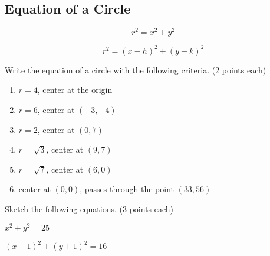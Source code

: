 \documentclass[12pt]{article}
\begin{document}
\pagebreak

\subsection*{Equation of a Circle}

$$r^2=x^2+y^2$$

$$r^2=(x-h)^2+(y-k)^2$$

Write the equation of a circle with the following criteria. (2 points each)\\

\begin{enumerate}[resume]

	\item $r=4$, center at the origin\\
	
	\item $r=6$, center at $(-3,-4)$\\
	
	\item $r=2$, center at $(0,7)$\\
	
	\item $r=\sqrt{3}$, center at $(9,7)$\\
	
	\item $r=\sqrt{7}$, center at $(6,0)$\\
	
	\item center at $(0,0)$, passes through the point $(33,56)$\\
	
	
\end{enumerate}

\hrulefill

Sketch the following equations. (3 points each)\\

\begin{enumerate}[resume]
\begin{multicols}{2}

	\item $x^2+y^2=25$\\
	
	
	\item $(x-1)^2+(y+1)^2=16$\\
	

\end{multicols}
\end{enumerate}
\end{document}
